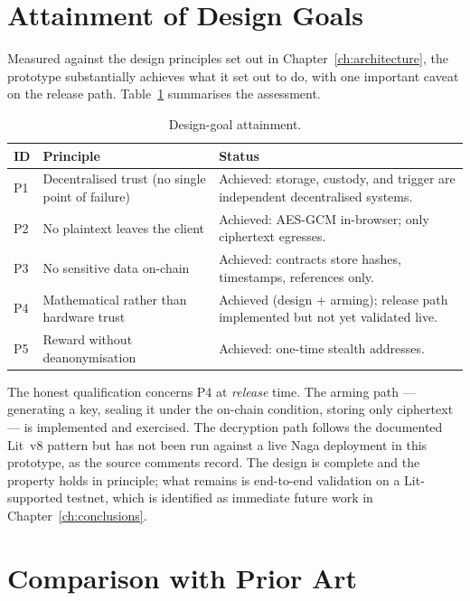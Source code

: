 \section{Attainment of Design Goals}
\label{sec:eval-goals}

Measured against the design principles set out in Chapter~\ref{ch:architecture},
the prototype substantially achieves what it set out to do, with one important
caveat on the release path. Table~\ref{tab:goal-attainment} summarises the
assessment.

\begin{table}[h]
\centering
\caption{Design-goal attainment.}
\label{tab:goal-attainment}
\begin{tabular}{p{0.9cm} p{6.6cm} p{5.8cm}}
\toprule
\textbf{ID} & \textbf{Principle} & \textbf{Status} \\
\midrule
P1 & Decentralised trust (no single point of failure) & Achieved: storage, custody, and trigger are independent decentralised systems. \\
P2 & No plaintext leaves the client                  & Achieved: AES-GCM in-browser; only ciphertext egresses. \\
P3 & No sensitive data on-chain                       & Achieved: contracts store hashes, timestamps, references only. \\
P4 & Mathematical rather than hardware trust          & Achieved (design + arming); release path implemented but not yet validated live. \\
P5 & Reward without deanonymisation                   & Achieved: one-time stealth addresses. \\
\bottomrule
\end{tabular}
\end{table}

The honest qualification concerns P4 at \emph{release} time. The arming path ---
generating a key, sealing it under the on-chain condition, storing only
ciphertext --- is implemented and exercised. The decryption path follows the
documented Lit~v8  pattern but has not been run against a live
Naga deployment in this prototype, as the source comments record. The design is
complete and the property holds in principle; what remains is end-to-end
validation on a Lit-supported testnet, which is identified as immediate future
work in Chapter~\ref{ch:conclusions}.

\section{Comparison with Prior Art}
\label{sec:eval-comparison}

